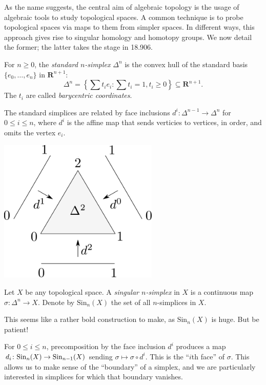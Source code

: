 As the name suggests, the central aim of algebraic topology is the usage of algebraic tools to study topological spaces. A common technique is to probe topological spaces via maps to them from simpler spaces. In different ways, this approach gives rise to singular homology and homotopy groups. We now detail the former; the latter takes the stage in 18.906.
\begin{definition}
For $n\geq 0$, the \emph{standard $n$-simplex} $\Delta^n$ is the convex hull of the standard basis $\{e_0,\ldots,e_n\}$ in $\mathbf{R}^{n+1}$:
$$\Delta^n = \left\{\sum t_i e_i : \sum t_i = 1, t_i\geq 0\right\}\subseteq\mathbf{R}^{n+1}.$$
The $t_i$ are called {\em barycentric coordinates}.
\end{definition}
The standard simplices are related by face inclusions $d^i\colon \Delta^{n-1} \to \Delta^{n}$ for $0\leq i \leq n$, where $d^i$ is the affine map that sends
verticies to vertices, in order, and omits the vertex $e_i$.

\begin{center}
\includegraphics[width=3in]{905/Figures/01-2-simplex.pdf}
\end{center}

\begin{definition}
Let $X$ be any topological space. A \emph{singular $n$-simplex} in $X$ is a continuous map $\sigma:\Delta^n\to X$. Denote by $\mathrm{Sin}_n(X)$ the set of all $n$-simplices in $X$.
\end{definition}
    
This seems like a rather bold construction to make, as $\mathrm{Sin}_n(X)$ is huge. But be patient! 

For $0\leq i \leq n$, precomposition by the face inclusion $d^i$ produces a map $d_i\colon \mathrm{Sin}_n(X)\to\mathrm{Sin}_{n-1}(X)$ sending $\sigma\mapsto\sigma\circ d^i$. This is the ``$i$th face'' of $\sigma$. This allows us to make sense of the ``boundary'' of a simplex, and we are particularly interested in simplices for which that boundary vanishes.

